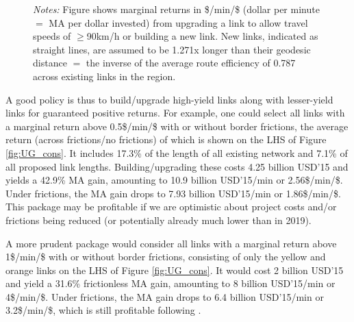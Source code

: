 \documentclass[a4paper]{article}
\begin{document}
\begin{figure}[h!]
{\begin{tabular}{@{}c@{}c@{}@{}c@{}}
\end{tabular}
}
\raggedright
\scriptsize 
\emph{Notes:} Figure shows marginal returns in \$/min/\$ (dollar per minute $=$ MA per dollar invested) from upgrading a link to allow travel speeds of $\geq$90km/h or building a new link. New links, indicated as straight lines, are assumed to be 1.271x longer than their geodesic distance $=$ the inverse of the average route efficiency of 0.787 across existing links in the region.  
\end{figure}

A good policy is thus to build/upgrade high-yield links along with lesser-yield links for guaranteed positive returns. For example, one could select all links with a marginal return above 0.5\$/min/\$ with or without border frictions, the average return (across frictions/no frictions) of which is shown on the LHS of Figure \ref{fig:UG_cons}. It includes 17.3\% of the length of all existing network and 7.1\% of all proposed link lengths. Building/upgrading these costs 4.25 billion USD'15 and yields a 42.9\% MA gain, amounting to 10.9 billion USD'15/min or 2.56\$/min/\$. Under frictions, the MA gain drops to 7.93 billion USD'15/min or 1.86\$/min/\$. This package may be profitable if we are optimistic about project costs and/or frictions being reduced (or potentially already much lower than in 2019). \newline 

A more prudent package would consider all links with a marginal return above 1\$/min/\$ with or without border frictions, consisting of only the yellow and orange links on the LHS of Figure \ref{fig:UG_cons}. It would cost 2 billion USD'15 and yield a 31.6\% frictionless MA gain, amounting to 8 billion USD'15/min or 4\$/min/\$. Under frictions, the MA gain drops to 6.4 billion USD'15/min or 3.2\$/min/\$, which is still profitable following \citet{donaldson2016railroads}. 
\end{document}
